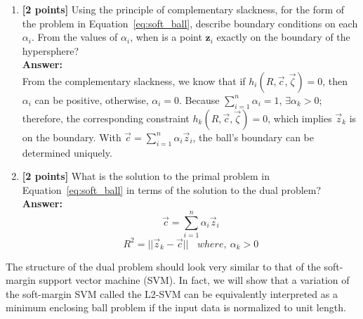 \documentclass{article}
\begin{document}
\begin{enumerate}[resume]
\item \textbf{[2 points]} Using the principle of complementary slackness, for the form of the problem in Equation~\ref{eq:soft_ball}, describe boundary conditions on each $\alpha_i$. From the values of $\alpha_i$, when is a point $\boldsymbol{z}_i$ exactly on the boundary of the hypersphere?\\
\textbf{Answer:}\\

From the complementary slackness, we know that if $h_i(R,\vec{c},\vec{\zeta})=0$, then $\alpha_i$ can be positive, otherwise, $\alpha_i=0$. Because $\sum_{i=1}^n\alpha_i=1$, $\exists \alpha_k>0$; therefore, the corresponding constraint $h_k(R,\vec{c},\vec{\zeta})=0$, which implies $\vec{z}_k$ is on the boundary. With $\vec{c}=\sum_{i=1}^n\alpha_i\vec{z}_i$, the ball's boundary can be determined uniquely.

\item \textbf{[2 points]} What is the solution to the primal problem in Equation~\ref{eq:soft_ball} in terms of the solution to the dual problem?\\
\textbf{Answer:}\\
$$\vec{c}=\sum_{i=1}^n\alpha_i\vec{z}_i$$
$$R^2=||\vec{z}_k-\vec{c}||~~~~where,~\alpha_k>0$$



\end{enumerate}

The structure of the dual problem should look very similar to that of the soft-margin support vector 
machine (SVM). In fact, we will show that a variation of the soft-margin SVM called the L2-SVM can be equivalently interpreted 
as a minimum enclosing ball problem if the input data is normalized to unit length.
\end{document}
